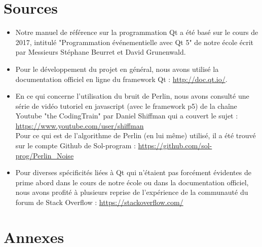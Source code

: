 \documentclass[a4paper,10pt,openany,oneside]{report}
\begin{document}
\chapter{Sources}
\begin{itemize}
\item Notre manuel de référence sur la programmation Qt a été basé sur le cours de 2017, intitulé "Programmation événementielle avec Qt 5" de notre école écrit par Messieurs Stéphane Beurret et David Grunenwald.
\item Pour le développement du projet en général, nous avons utilisé la documentation officiel en ligne du framework Qt : \url{http://doc.qt.io/}.
\item En ce qui concerne l'utilisation du bruit de Perlin, nous avons consulté une série de vidéo tutoriel en javascript (avec le framework p5) de la chaîne Youtube "the CodingTrain" par Daniel Shiffman qui a couvert le sujet : \url{https://www.youtube.com/user/shiffman}\\
Pour ce qui est de l'algorithme de Perlin (en lui même) utilisé, il a été trouvé sur le compte Github de Sol-program :
\url{https://github.com/sol-prog/Perlin_Noise}
\item Pour diverses spécificités liées à Qt qui n'étaient pas forcément évidentes de prime abord dans le cours de notre école ou dans la documentation officiel, nous avons profité à plusieurs reprise de l'expérience de la communauté du forum de Stack Overflow : \url{https://stackoverflow.com/}
\end{itemize}

\chapter{Annexes}
\thispagestyle{headings}
\end{document}

